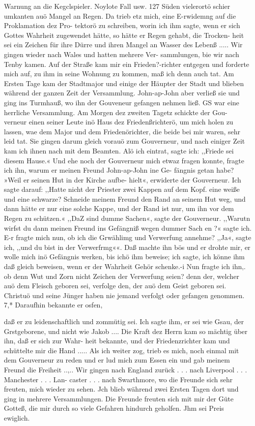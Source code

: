 Warnung an die Kegclspieler. Noylote Fall usw. 127
Süden vielerortö schier umkanten auö Mangel an Regen. Da
trieb etz mich, eine E-rwidemng auf die Proklamation dez Pro-
tektorö zu schreiben, worin ich ihm sagte, wenn er sich Gottes
Wahrheit zugewendet hätte, so hätte er Regen gehabt, die Trocken-
heit sei ein Zeichen für ihre Dürre und ihren Mangel an Wasser
des Lebenß .....
Wir gingen wieder nach Wales und hatten mehrere Ver-
sammlungen, bie wir nach Tenby kamen. Auf der Straße kam
mir ein Frieden?-richter entgegen und forderte mich auf, zu ihm
in seine Wohnung zu kommen, maß ich denn auch tat. Am
Ersten Tage kam der Stadtmajor und einige der Häupter der
Stadt und blieben während der ganzen Zeit der Versammlung.
John-ap-John aber verließ sie und ging ins Turmhauß, wo ihn
der Gouveneur gefangen nehmen ließ. GS war eine herrliche
Versammlung. Am Morgen dez zweiten Tagetz schickte der Gou-
verneur einen seiner Leute inö Haus dez Friedenßrichterö, um mich
holen zu lassen, wae dem Major und dem Friedenörichter, die
beide bei mir waren, sehr leid tat. Sie gingen darum gleich
vorauö zum Gouverneur, und nach einiger Zeit kam ich ihnen nach
mit dem Beamten. Alö ich eintrat, sagte ich: ,,Friede sei diesem
Hause.« Und ehe noch der Gouverneur mich etwaz fragen konnte,
fragte ich ihn, warum er meinen Freund John-ap-John ine Ge-
fängnis getan habe? »Weil er seinen Hut in der Kirche aufbe-
hielt«, erwiderte der Gouverneur. Ich sagte darauf: ,,Hatte nicht
der Priester zwei Kappen auf dem Kopf. eine weiße und eine
schwarze? Schneide meinem Freund den Rand an seinem Hut
weg, und dann hätte er nur eine solche Kappe, und der Rand
ist nur, um ihn vor dem Regen zu schützen.« ,,DaZ sind dumme
Sachen«, sagte der Gouverneur. ,,Warutn wirfst du dann meinen
Freund ins Gefängniß wegen dummer Sach en ?« sagte ich. E-r fragte
mich nun, ob ich die Grwählimg und Verwerfung annehme?
,,Ja«, sagte ich, ,,und du bist in der Verwerfrmg««. Daß machte
ihn bös und er drohte mir, er wolle mich inö Gefängnis werken,
bis ichö ihm beweise; ich sagte, ich könne ihm daß gleich beweisen,
wenn er der Wahrheit Gehör schenke.-i Nun fragte ich ihn,. ob denn
Wut und Zorn nicht Zeichen der Verwerfung seien? denn der,
welcher auö dem Fleisch geboren sei, verfolge den, der auö dem
Geist geboren sei. Christuö und seine Jünger haben nie jemand
verfolgt oder gefangen genommen. 7,* Daraufhin bekannte er osfen,


daß er zu leidenschaftlich und zommütig sei. Ich sagte ihm, er
sei wie Gsau, der Grstgeborene, und nicht wie Jakob .... Die
Kraft dez Herrn kam so mächtig über ihn, daß er sich zur Wahr-
heit bekannte, und der Friedenzrichter kam und schüttelte mir
die Hand ..... Als ich weiter zog, trieb es mich, noch einmal
mit dem Gouverneur zu reden und er lud mich zum Essen ein
und gab meinem Freund die Freiheit ..,.. Wir gingen nach
England zurück . . . nach Liverpool . . . Manchester . . . Lan-
caster . . . nach Swarthmore, wo die Freunde sich sehr freuten,
mich wieder zu sehen. Jch blieb während zwei Ersten Tagen
dort und ging in mehrere Versammlungen. Die Freunde freuten
sich mit mir der Güte Gotteß, die mir durch so viele Gefahren
hindurch geholfen. Jhm sei Preis ewiglich.

